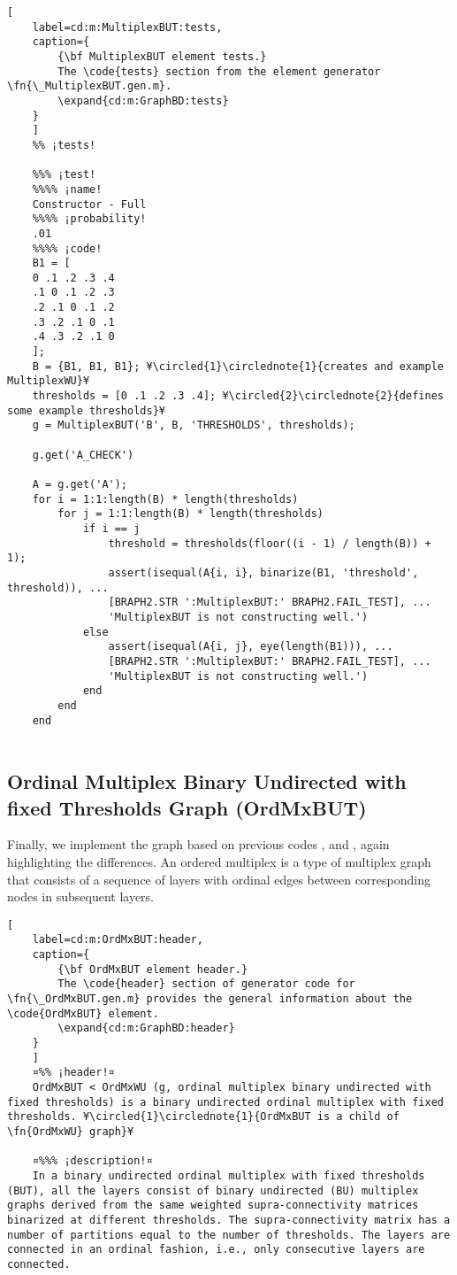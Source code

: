 \documentclass{tufte-handout}
\begin{document}
\begin{lstlisting}[
	label=cd:m:MultiplexBUT:tests,
	caption={
		{\bf MultiplexBUT element tests.}
		The \code{tests} section from the element generator \fn{\_MultiplexBUT.gen.m}.
		\expand{cd:m:GraphBD:tests}
	}
	]
	%% ¡tests!
	
	%%% ¡test!
	%%%% ¡name!
	Constructor - Full
	%%%% ¡probability!
	.01
	%%%% ¡code!
	B1 = [
	0 .1 .2 .3 .4 
	.1 0 .1 .2 .3
	.2 .1 0 .1 .2
	.3 .2 .1 0 .1
	.4 .3 .2 .1 0
	]; 
	B = {B1, B1, B1}; ¥\circled{1}\circlednote{1}{creates and example MultiplexWU}¥
	thresholds = [0 .1 .2 .3 .4]; ¥\circled{2}\circlednote{2}{defines some example thresholds}¥
	g = MultiplexBUT('B', B, 'THRESHOLDS', thresholds);
	
	g.get('A_CHECK')
	
	A = g.get('A');
	for i = 1:1:length(B) * length(thresholds)
		for j = 1:1:length(B) * length(thresholds)
			if i == j
				threshold = thresholds(floor((i - 1) / length(B)) + 1);
				assert(isequal(A{i, i}, binarize(B1, 'threshold', threshold)), ...
				[BRAPH2.STR ':MultiplexBUT:' BRAPH2.FAIL_TEST], ...
				'MultiplexBUT is not constructing well.')
			else
				assert(isequal(A{i, j}, eye(length(B1))), ...
				[BRAPH2.STR ':MultiplexBUT:' BRAPH2.FAIL_TEST], ...
				'MultiplexBUT is not constructing well.')            
			end
		end
	end
	
\end{lstlisting}



\clearpage

\subsection{Ordinal Multiplex Binary Undirected with fixed Thresholds Graph (OrdMxBUT)}

Finally, we implement the  graph based on previous codes ,  and , again highlighting the differences. An ordered multiplex is a type of multiplex graph that consists of a sequence of layers with ordinal edges between corresponding nodes in subsequent layers.


\begin{lstlisting}[
	label=cd:m:OrdMxBUT:header,
	caption={
		{\bf OrdMxBUT element header.}
		The \code{header} section of generator code for \fn{\_OrdMxBUT.gen.m} provides the general information about the \code{OrdMxBUT} element.
		\expand{cd:m:GraphBD:header}
	}
	]
	¤%% ¡header!¤
	OrdMxBUT < OrdMxWU (g, ordinal multiplex binary undirected with fixed thresholds) is a binary undirected ordinal multiplex with fixed thresholds. ¥\circled{1}\circlednote{1}{OrdMxBUT is a child of \fn{OrdMxWU} graph}¥
	
	¤%%% ¡description!¤
	In a binary undirected ordinal multiplex with fixed thresholds (BUT), all the layers consist of binary undirected (BU) multiplex graphs derived from the same weighted supra-connectivity matrices binarized at different thresholds. The supra-connectivity matrix has a number of partitions equal to the number of thresholds. The layers are connected in an ordinal fashion, i.e., only consecutive layers are connected.
\end{lstlisting}
\end{document}
